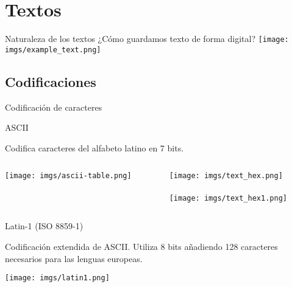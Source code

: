 \section{Textos}
\begin{frame}{Naturaleza de los textos}
    \centering\Large ¿Cómo guardamos texto de forma digital?
    \texttt{[image: imgs/example\_text.png]}
\end{frame}

\subsection{Codificaciones}
\begin{frame}{Codificación de caracteres}
    \centering
\end{frame}

\begin{frame}{ASCII}
    \begin{block}{}
        \centering Codifica caracteres del alfabeto latino en 7 bits.
    \end{block}
    \begin{columns}
    \begin{column}{0.40\textwidth}
        \texttt{[image: imgs/ascii-table.png]}
    \end{column}
    \begin{column}{0.55\textwidth}
        \centering
        \texttt{[image: imgs/text\_hex.png]} \\
        \Huge \textdownarrow \\
        \texttt{[image: imgs/text\_hex1.png]}
    \end{column}
    \end{columns}
\end{frame}

\begin{frame}{Latin-1 (ISO 8859-1)}
    \begin{block}{}
        Codificación extendida de ASCII. Utiliza 8 bits añadiendo 128 caracteres necesarios para las lenguas europeas.
    \end{block}
    \centering\texttt{[image: imgs/latin1.png]}
\end{frame}

